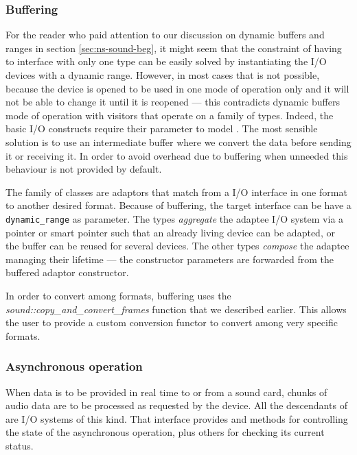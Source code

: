 \subsubsection{Buffering}

For the reader who paid attention to our discussion
on dynamic buffers and ranges in section \ref{sec:ns-sound-beg}, it
might seem that the constraint of having to interface with only one
type can be easily solved by instantiating the I/O devices with a
dynamic range. However, in most cases that is not possible, because
the device is opened to be used in one mode of operation only and it
will not be able to change it until it is reopened --- this
contradicts dynamic buffers mode of operation with visitors that
operate on a family of types. Indeed, the basic I/O constructs require
their  parameter to model
. The most sensible solution is to use
an intermediate buffer where we convert the data before sending it or
receiving it. In order to avoid overhead due to buffering when
unneeded this behaviour is not provided by default.

The  family of classes are adaptors that match from
a I/O interface in one format to another desired format. Because of
buffering, the target interface can be have a \texttt{dynamic\_range}
as parameter. The  types \emph{aggregate}
the adaptee I/O system via a pointer or smart pointer such that an
already living device can be adapted, or the buffer can be reused for
several devices. The other types \emph{compose} the adaptee managing
their lifetime --- the constructor parameters are forwarded from the
buffered adaptor constructor.

In order to convert among formats, buffering uses the
\emph{sound::co\-py\_and\_con\-vert\_fra\-mes} function that we
described earlier. This allows the user to provide a custom conversion
functor to convert among very specific formats.

\subsubsection{Asynchronous operation}
\label{sec:asyncio}

When data is to be provided in real time to or from a sound card,
chunks of audio data are to be processed as requested by the
device. All the descendants of  are I/O systems of
this kind. That interface provides  and 
methods for controlling the state of the asynchronous operation, plus
others for checking its current status.


